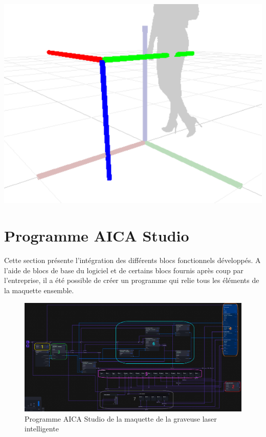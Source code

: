 \begin{minipage}{0.4\textwidth}
    \centering
    \includegraphics[width=0.95\linewidth]{assets/figures/Transform_example.png}
\end{minipage}

\section{Programme AICA Studio}

Cette section présente l'intégration des différents blocs fonctionnels développés. A l'aide de blocs de base du logiciel et de certains blocs fournis après coup par l'entreprise, il a été possible de créer un programme qui relie tous les éléments de la maquette ensemble.

\begin{figure}[H]
    \centering
    \includegraphics[width=1\textwidth]{assets/figures/AICA_PROG.png}
    \caption{Programme AICA Studio de la maquette de la graveuse laser intelligente}
    \label{fig:aica_programme}
\end{figure}

